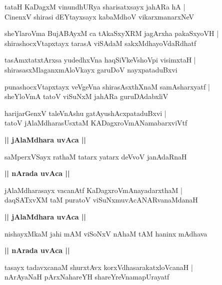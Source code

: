 \documentclass[twoside,12pt,openright]{book}
\newcounter{shloka}[chapter]
\def\uvaca#1{\centerline{{\large\textbf{#1}}}}
\begin{document}
\begin{shloka}%
tataH KaDagxM vinundhURya sharisatxsayx jahARa hA |\\
CinenxV shirasi dEYtayxsayx kabaMdhoV vikarxmanarxNeV 
\end{shloka}

\begin{shloka}%
sheYlaroVma BujABAyxM ca tAkaSxyXRM jagArxha pakaSxyoVH |\\
shirashocxVtapxtayx tarasA viSAdaM sakxMdhayoVdaRdhatf
\end{shloka}

\begin{shloka}%
tasAmxtatxtArxsa yudedhxVna haqSiVkeVshoVpi visimxtaH |\\
shirasasxMlaganxmAloVkayx garuDoV nayxpataduBxvi
\end{shloka}

\begin{shloka}%
punashocxVtapxtayx veVgeVna shirasAsxthXnaM samAsharxyatf |\\
sheYloVmA tatoV viSuNxM jahARa guruDAdabxliV 
\end{shloka}

\begin{shloka}%
harijarGenxV taleVnAshu gatAyushAcxpataduBxvi |\\
tatoV jAlaMdharasUsxtaM KADagxroVmANamabarxviVtf
\end{shloka}

\uvaca{|| jAlaMdhara uvAca ||}

\begin{shloka}%
saMperxVSayx rathaM tatarx yatarx deVvoV janAdaRnaH
\end{shloka}

\uvaca{|| nArada uvAca ||}

\begin{shloka}%
jAlaMdharasayx vacanAtf KaDagxroVmAnayadarxthaM |\\
daqSATxvXM taM puratoV viSuNxmuvAcANARvanaMdanaH
\end{shloka}

\uvaca{|| jAlaMdhara uvAca ||}

\begin{shloka}%
nishayxMkaM jahi mAM viSoNxV nAhaM tAM haninx mAdhava 
\end{shloka}

\uvaca{|| nArada uvAca ||}

\begin{shloka}%
tasayx tadavxcanaM shurxtAvx korxVdhasarakatxloVcanaH |\\
nArAyaNaH pArxNahareYH shareYreVnamapUrayatf
\end{shloka}
\end{document}
